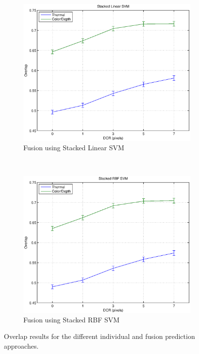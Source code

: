 \documentclass[10pt,twocolumn,letterpaper]{article}
\begin{document}
\begin{figure}[ht]
	\\
	\begin{subfigure}[b]{0.47\textwidth}
 		\includegraphics[width=1\textwidth]{results/stackedlinearsvm.eps} 			
		\caption{Fusion using Stacked Linear SVM}
    		\label{fig:stackedlinearsvm}
 	\end{subfigure}
	~
	\begin{subfigure}[b]{0.47\textwidth}
 		\includegraphics[width=1\textwidth]{results/stackedrbfsvm.eps} 			
		\caption{Fusion using Stacked RBF SVM}
    		\label{fig:stackedrbfsvm}
 	\end{subfigure}
	\caption{Overlap results for the different individual and fusion prediction approaches.}
	\label{fig:overlapgraph}
\end{figure}
\end{document}
